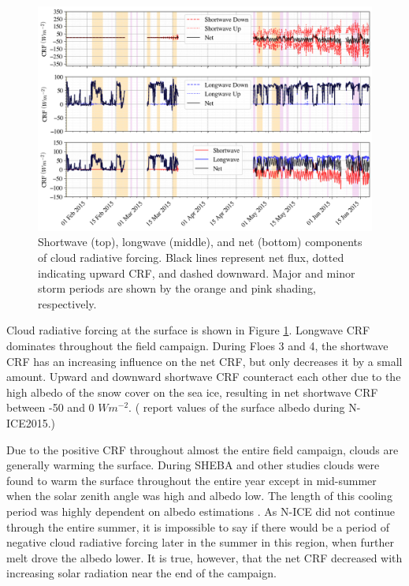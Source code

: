 \begin{figure}[t!]
    \centering
    \includegraphics[width=1\linewidth]{figures/chapter4/RadForcing.png}
    \caption[Shortwave, longwave, and net components of cloud radiative forcing.]{Shortwave (top), longwave (middle), and net (bottom) components of cloud radiative forcing. Black lines represent net flux, dotted indicating upward CRF, and dashed downward. Major and minor storm periods are shown by the orange and pink shading, respectively.}
    \label{fig:crf_timeseries}
\end{figure}

Cloud radiative forcing at the surface is shown in Figure \ref{fig:crf_timeseries}. Longwave CRF dominates throughout the field campaign. During Floes 3 and 4, the shortwave CRF has an increasing influence on the net CRF, but only decreases it by a small amount. Upward and downward shortwave CRF counteract each other due to the high albedo of the snow cover on the sea ice, resulting in net shortwave CRF between -50 and 0 $Wm^{-2}$. (\citet{walden:2017} report values of the surface albedo during N-ICE2015.) 

Due to the positive CRF throughout almost the entire field campaign, clouds are generally warming the surface. During SHEBA and other studies \citep{schweiger:2004, cogley:1984, walsh:1998, curry:1996} clouds were found to warm the surface throughout the entire year except in mid-summer when the solar zenith angle was high and albedo low. The length of this cooling period was highly dependent on albedo estimations \citep{intrieri:2002}. As N-ICE did not continue through the entire summer, it is impossible to say if there would be a period of negative cloud radiative forcing later in the summer in this region, when further melt drove the albedo lower. It is true, however, that the net CRF decreased with increasing solar radiation near the end of the campaign.

